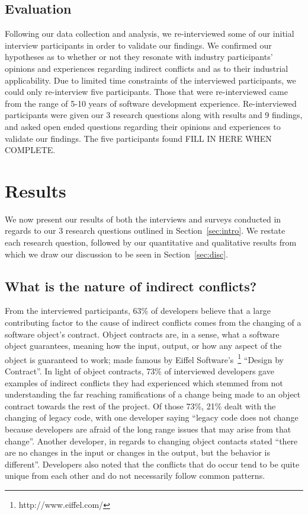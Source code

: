 \documentclass[conference]{IEEEtran}
\begin{document}
\subsection{Evaluation}

Following our data collection and analysis, we re-interviewed some of our initial interview participants
in order to validate our findings. We confirmed our hypotheses as to whether or not they resonate with 
industry participants' opinions and experiences regarding indirect conflicts and as to their industrial 
applicability. Due to limited time constraints of the interviewed participants, we could only re-interview
five participants. Those that were re-interviewed came from the range of 5-10 years of software development
experience. Re-interviewed participants were given our 3 research questions along with results and 9 findings,
and asked open ended questions regarding their opinions and experiences to validate our findings. The five
participants found FILL IN HERE WHEN COMPLETE.

\section{Results}
\label{sec:results}

We now present our results of both the interviews and surveys conducted in regards to our 3 research questions
outlined in Section~\ref{sec:intro}. We restate each research question, followed by our quantitative and qualitative
results from which we draw our discussion to be seen in Section~\ref{sec:disc}.

\subsection{What is the nature of indirect conflicts?}

From the interviewed participants, 63\% of developers believe that a large contributing factor to the cause
of indirect conflicts comes from the changing of a software object's contract. Object contracts are, in a sense,
what a software object guarantees, meaning how the input, output, or how any aspect of the object is guaranteed
to work; made famous by Eiffel Software's~\footnote{http://www.eiffel.com/} ``Design by Contract''\texttrademark. 
In light of object contracts, 73\% of interviewed developers gave examples of indirect conflicts they had experienced
which stemmed from not understanding the far reaching ramifications of a change being made to an object contract
towards the rest of the project. Of those 73\%, 21\% dealt
with the changing of legacy code, with one developer saying ``legacy code does not change because developers 
are afraid of the long range issues that may arise from that change''. Another developer, in regards to changing
object contacts stated ``there are no changes in the input or changes in the output, but the behavior is different''.
Developers also noted that the conflicts that do occur tend to be quite unique from each other and do not necessarily
follow common patterns.
\end{document}
